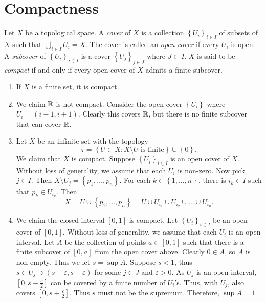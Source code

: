 \section{Compactness}

\begin{definition}[Compact]
	Let $X$ be a topological space.
	A \emph{cover} of $X$ is a collection 
	$
		\left\{
			U_i
		\right\}_{i \in I}
	$
	of subsets of $X$ such that 
	$\bigcup_{i \in I} U_i = X$.
	The cover is called an \emph{open cover} if every $U_i$ is open.
	A \emph{subcover} of
	$
		\left\{
			U_i
		\right\}_{i \in I}
	$
	is a cover
	$
		\left\{
			U_j
		\right\}_{j \in J}
	$
	where $J \subset I$.
	$X$ is said to be \emph{compact} if and only if every open cover of $X$
	admits a finite subcover.
\end{definition}

\begin{examples}
	\begin{enumerate}
		\item If $X$ is a finite set, it is compact.
		\item We claim $\mathbb{R}$ is not compact.
			Consider the open cover
			$\left\{
				U_i
			\right\}$
			where
			$U_i = (i-1,i+1)$.
			Clearly this covers $\mathbb{R}$, but there is no finite
			subcover that can cover $\mathbb{R}$.
		\item Let $X$ be an infinite set with the topology
			\[
				\tau = \left\{
					U \subset X: 
					\text{$X \setminus U$ is finite}
				\right\} \cup \left\{
					0
				\right\}.
			\]
			We claim that $X$ is compact.
			Suppose
			$
				\left\{
					U_i
				\right\}_{i \in I}
			$ 
			is an open cover of $X$.
			Without loss of generality, we assume that each $U_i$ is
			non-zero.
			Now pick $j \in I$.
			Then
			$
				X \setminus U_j = \left\{
					p_1, \ldots, p_n
				\right\}
			$.
			For each
			$
				k \in \left\{
					1, \ldots, n
				\right\}
			$,
			there is 
			$i_k \in I$
			such that
			$p_k \in U_{i_k}$.
			Then
			\[
				X 
				= U \cup \left\{
					p_1, \ldots, p_n
				\right\}
				= U \cup U_{i_1} \cup U_{i_2} \cup \ldots \cup U_{i_n}.
			\]
		\item We claim the closed interval $[0,1]$ is compact.
			Let
			$
				\left\{
					U_i
				\right\}_{i \in I}
			$
			be an open cover of $[0,1]$.
			Without loss of generality, we assume that each $U_i$
			is an open interval.
			Let $A$ be the collection of points $a \in [0,1]$
			such that there is a finite subcover of $[0,a]$
			from the open cover above.
			Clearly $0 \in A$, so $A$ is non-empty.
			Thus we let $s = \sup A$.
			Suppose $s < 1$, thus
			$s \in U_j \supset (s - \varepsilon, s + \varepsilon)$ 
			for some $j \in J$ and $\varepsilon > 0$.
			As $U_j$ is an open interval, 
			$
				\left[
					0, s - \frac{\varepsilon}{2}
				\right]
			$
			can be covered by a finite number of $U_i$'s.
			Thus, with $U_j$, also covers
			$
				\left[
					0, s + \frac{\varepsilon}{2} 
				\right]
			$.
			Thus $s$ must not be the supremum. 
			Therefore, $\sup A = 1$.
	\end{enumerate}
\end{examples}

